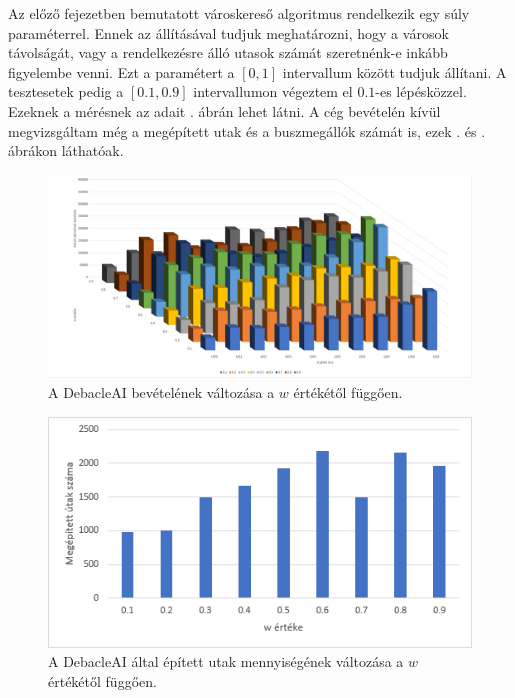 
Az előző fejezetben bemutatott városkereső algoritmus rendelkezik egy súly paraméterrel. Ennek az állításával tudjuk meghatározni, hogy a városok távolságát, vagy a rendelkezésre álló utasok számát szeretnénk-e inkább figyelembe venni.  Ezt a paramétert a $[0, 1]$ intervallum között tudjuk állítani. A tesztesetek pedig a $[0.1, 0.9]$ intervallumon végeztem el $0.1$-es lépésközzel. Ezeknek a mérésnek az adait . ábrán lehet látni. A cég bevételén kívül megvizsgáltam még a megépített utak és a buszmegállók számát is, ezek . és . ábrákon láthatóak.

\begin{figure}
	\centering
	\includegraphics[width=\textwidth]{images/wmeresek.png}
	\caption{A DebacleAI bevételének változása a $w$ értékétől függően.}
	\label{fig:meresek}
\end{figure}

\begin{figure}
	\centering
	\includegraphics[width=\textwidth]{images/wutak.png}
	\caption{A DebacleAI által épített utak mennyiségének változása a $w$ értékétől függően.}
	\label{fig:utak}
\end{figure}


